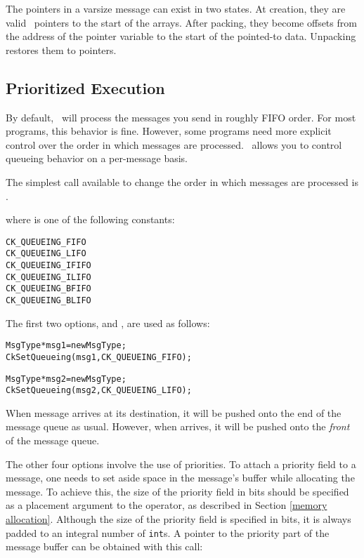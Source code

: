 The pointers in a varsize message can exist in two states.  
At creation, they are valid \CC\ pointers to the start of the arrays.  
After packing, they become offsets from the address of the pointer variable to 
the start of the pointed-to data.  Unpacking restores them to pointers. 


\subsection{Prioritized Execution}
\label{prioritized message passing}

By default, \charmpp\ will process the messages you send in roughly
FIFO order.  For most programs, this
behavior is fine.  However, some programs need more explicit control
over the order in which messages are processed.  \charmpp\ allows you
to control queueing behavior on a per-message basis.

The simplest call available to change the order in which messages
are processed is .


where  is one of the following
constants:

\begin{alltt}
  CK_QUEUEING_FIFO
  CK_QUEUEING_LIFO
  CK_QUEUEING_IFIFO
  CK_QUEUEING_ILIFO
  CK_QUEUEING_BFIFO
  CK_QUEUEING_BLIFO
\end{alltt}

The first two options,   and
, are used as follows: 

\begin{alltt}
  MsgType *msg1 = new MsgType ;
  CkSetQueueing(msg1, CK_QUEUEING_FIFO);

  MsgType *msg2 = new MsgType ;
  CkSetQueueing(msg2, CK_QUEUEING_LIFO);
\end{alltt}

When message  arrives at its destination, it will be pushed
onto the end of the message queue as usual.  However, when 
arrives, it will be pushed onto the {\em front} of the message queue.

The other four options involve the use of
priorities.  To attach a priority field to a
message, one needs to set aside space in the message's buffer while
allocating the message.  To achieve this, the
size of the priority field in bits should be
specified as a placement argument to the  operator, as
described in Section \ref{memory allocation}.  Although the size of
the priority field is specified in bits, it is always padded to an
integral number of {\tt int}s.  A pointer to the priority part of the
message buffer can be obtained with this call:

